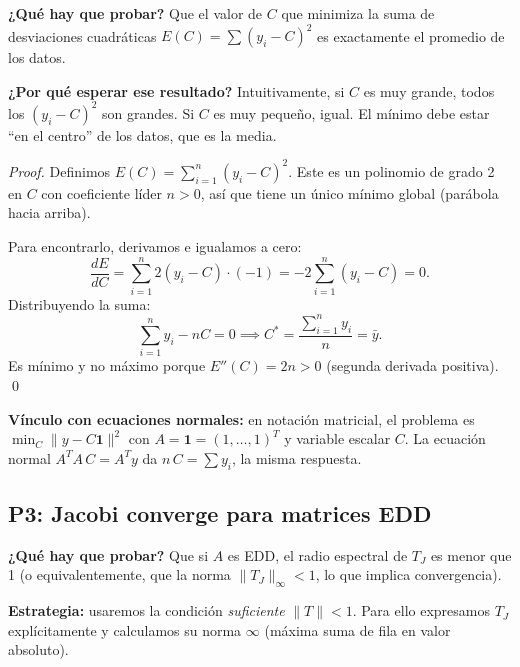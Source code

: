 \documentclass[11pt,a4paper]{article}
\begin{document}
\textbf{¿Qué hay que probar?} Que el valor de $C$ que minimiza la suma de desviaciones cuadráticas $E(C)=\sum(y_i-C)^2$ es exactamente el promedio de los datos.

\textbf{¿Por qué esperar ese resultado?} Intuitivamente, si $C$ es muy grande, todos los $(y_i-C)^2$ son grandes. Si $C$ es muy pequeño, igual. El mínimo debe estar ``en el centro'' de los datos, que es la media.

\begin{proof}
Definimos $E(C)=\sum_{i=1}^n(y_i-C)^2$. Este es un polinomio de grado 2 en $C$ con coeficiente líder $n>0$, así que tiene un único mínimo global (parábola hacia arriba).

Para encontrarlo, derivamos e igualamos a cero:
\[
  \frac{dE}{dC} = \sum_{i=1}^n 2(y_i-C)\cdot(-1) = -2\sum_{i=1}^n(y_i-C) = 0.
\]
Distribuyendo la suma:
\[
  \sum_{i=1}^ny_i - nC = 0 \implies C^* = \frac{\sum_{i=1}^ny_i}{n} = \bar y.
\]
Es mínimo y no máximo porque $E''(C) = 2n > 0$ (segunda derivada positiva). \qed
\end{proof}

\textbf{Vínculo con ecuaciones normales:} en notación matricial, el problema es $\min_C\|y-C\mathbf{1}\|^2$ con $A=\mathbf{1}=(1,\ldots,1)^T$ y variable escalar $C$. La ecuación normal $A^TA\,C=A^Ty$ da $n\,C=\sum y_i$, la misma respuesta.

\subsection{P3: Jacobi converge para matrices EDD}
\label{sec:q2_2016_p3}

\textbf{¿Qué hay que probar?} Que si $A$ es EDD, el radio espectral de $T_J$ es menor que 1 (o equivalentemente, que la norma $\|T_J\|_\infty<1$, lo que implica convergencia).

\textbf{Estrategia:} usaremos la condición \emph{suficiente} $\|T\|<1$. Para ello expresamos $T_J$ explícitamente y calculamos su norma $\infty$ (máxima suma de fila en valor absoluto).
\end{document}
